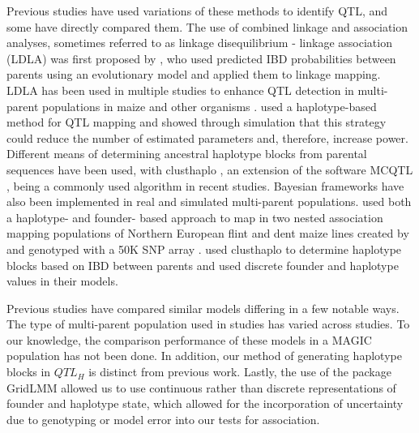 \documentclass[article,9pt,twocolumn,twoside]{rilabRxiv}
\begin{document}
Previous studies have used variations of these methods to identify QTL, and some have directly compared them.
The use of combined linkage and association analyses, sometimes referred to as linkage disequilibrium - linkage association (LDLA) was first proposed by \cite{Meuwissen}, who used predicted IBD probabilities between parents using an evolutionary model and applied them to linkage mapping.
LDLA has been used in multiple studies to enhance QTL detection in multi-parent populations in maize \citep{Giraud2,Yu2,McMullen} and other organisms \citep{Herault}.
\cite{Jansen} used a haplotype-based method for QTL mapping and showed through simulation that this strategy could reduce the number of estimated parameters and, therefore, increase power.
Different means of determining ancestral haplotype blocks from parental sequences have been used, with clusthaplo \citep{Leroux}, an extension of the software MCQTL \citep{Jourjon}, being a commonly used algorithm in recent studies.
Bayesian frameworks have also been implemented in real \citep{PerezEnciso} and simulated \citep{Bink} multi-parent populations.
\cite{Giraud} used both a haplotype- and founder- based approach to map in two nested association mapping populations of Northern European flint and dent maize lines created by \cite{Bauer} and genotyped with a 50K SNP array \citep{Ganal}.
\cite{Giraud} used clusthaplo to determine haplotype blocks based on IBD between parents and used discrete founder and haplotype values in their models.

Previous studies have compared similar models differing in a few notable ways.
The type of multi-parent population used in studies has varied across studies. To our knowledge, the comparison performance of these models in a MAGIC population has not been done.
In addition, our method of generating haplotype blocks in $QTL_H$ is distinct from previous work.
Lastly, the use of the package GridLMM \citep{Runcie} allowed us to use continuous rather than discrete representations of founder and haplotype state, which allowed for the incorporation of uncertainty due to genotyping or model error into our tests for association.
\end{document}
